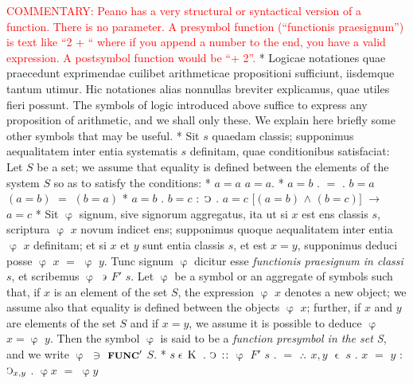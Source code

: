 \documentclass{book}
\newcommand{\C}{\mathop{\sbox0{$\displaystyle$$\reflectbox{C}$} %
\raisebox{-\height+\ht0-0.05cm}[\ht0][\dp0]{\scalebox{0.8}[0.8]{\copy0}}}\displaylimits} %
\newcommand{\pppNoSpace}{\leavevmode\lower0ex\hbox{.}\kern-0.1em\raise0.7ex\hbox{.}\kern-0.1em\lower0ex\hbox{.}} %
\newcommand{\such}{\thinspace \rotatebox[origin=c]{180}{$\epsilon$}}
\newcommand{\smallIn}{\ensuremath{\mathrel{\epsilon}}}
\newcommand{\K}{\mathop{\thinspace \text{K} \thinspace}}
\newcommand{\func}{\mathord{\text{{\footnotesize \textbf{FUNC}}}}}
\newcommand\commentary[1]{\textcolor{red}{COMMENTARY: #1}}
\newenvironment{translateTwoCol}
               { %
                 \columnratio{0.5, 0.5} \begin{paracol}{2}
                 \newcommand{\LAT}{\switchcolumn[0]*}
                 \newcommand{\ENG}{\switchcolumn[1]}
               }
               { %
                 \let\ENG\undefined
                 \let\LAT\undefined
                 \end{paracol}
               }
\begin{document}
\begin{translateTwoCol}
\ENG
\commentary{Peano has a very structural or syntactical version of a function.  There is no parameter.  A presymbol function (``functionis praesignum'') is text like ``2 + `` where if you append a number to the end, you have a valid expression.   A postsymbol function would be ``+ 2''.} 
\LAT  
Logicae notationes quae praecedunt exprimendae cuilibet arithmeticae propositioni sufficiunt, iisdemque tantum utimur. Hic notationes alias nonnullas breviter explicamus, quae utiles fieri possunt.
\ENG
The symbols of logic introduced above suffice to express any proposition of arithmetic, and we shall only these.  We explain here briefly some other symbols that may be useful.
\LAT
Sit $s$ quaedam classis; supponimus aequalitatem inter entia systematis $s$ definitam, quae conditionibus satisfaciat:
\ENG
Let $S$ be a set; we assume that equality is defined between the elements of the system $S$ so as to satisfy the conditions:
\LAT
\hspace{1.06cm} $a=a$
\ENG
\hspace{1.06cm} $a=a$.
\LAT
\hspace{1.06cm} $a=b$ $.$ $=$ $.$ $b=a$
\ENG
\hspace{1.06cm} $(a=b)$ $=$ $(b=a)$
\LAT
\hspace{1.06cm} $a=b$ . $b=c$ $:$ $\C$ $.$ $a=c$
\ENG
\hspace{1.06cm} $[(a=b)$ $\wedge$ $(b=c)]$ $\rightarrow$ $a=c$
\LAT
Sit $\upvarphi$ signum, sive signorum aggregatus, ita ut si $x$ est ens classis $s$, scriptura $\upvarphi$ $x$ novum indicet ens; supponimus quoque aequalitatem inter entia $\upvarphi$ $x$ definitam; et si $x$ et $y$ sunt entia classis $s$, et est $x=y$, supponimus deduci posse $\upvarphi$ $x$ $=$ $\upvarphi$ $y$. Tunc signum $\upvarphi$ dicitur esse \emph{functionis praesignum in classi} $s$, et scribemus $\upvarphi$ $\such$ $F'$ $s$.
\ENG
Let $\upvarphi$ be a symbol or an aggregate of symbols such that, if $x$ is an element of the set $S$, the expression $\upvarphi$ $x$ denotes a new object; we assume also that equality is defined between the objects $\upvarphi$ $x$; further, if $x$ and $y$ are elements of the set $S$ and if $x = y$, we assume it is possible to deduce $\upvarphi$ $x = \upvarphi$ $y$. Then the symbol $\upvarphi$ is said to be a \emph{function presymbol in the set S}, and we write $\upvarphi$ $\ni$ $\func'$ $S$.
\LAT
\hspace{1.06cm} $s \smallIn \K$ $.$ $\C$ $:\hspace{0.1em}:$ $\upvarphi$ $F'$ $s$ $.$ $=$ $\pppNoSpace$ $x,y$ $\smallIn$ $s$ $.$ $x$ $=$ $y$ $:$ $\C_{x,y}$ $.$ $\upvarphi x$ $=$ $\upvarphi y$

\end{translateTwoCol}
\end{document}
